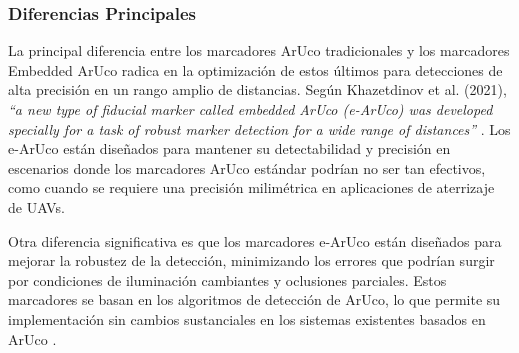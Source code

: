     \subsubsection{Diferencias Principales}

    La principal diferencia entre los marcadores ArUco tradicionales y los marcadores Embedded ArUco radica en la optimización de estos últimos para detecciones de alta precisión en un rango amplio de distancias. Según Khazetdinov et al. (2021), \textit{“a new type of fiducial marker called embedded ArUco (e-ArUco) was developed specially for a task of robust marker detection for a wide range of distances”} \cite{khazetdinov2021}. Los e-ArUco están diseñados para mantener su detectabilidad y precisión en escenarios donde los marcadores ArUco estándar podrían no ser tan efectivos, como cuando se requiere una precisión milimétrica en aplicaciones de aterrizaje de UAVs.

    Otra diferencia significativa es que los marcadores e-ArUco están diseñados para mejorar la robustez de la detección, minimizando los errores que podrían surgir por condiciones de iluminación cambiantes y oclusiones parciales. Estos marcadores se basan en los algoritmos de detección de ArUco, lo que permite su implementación sin cambios sustanciales en los sistemas existentes basados en ArUco \cite{khazetdinov2021}.

